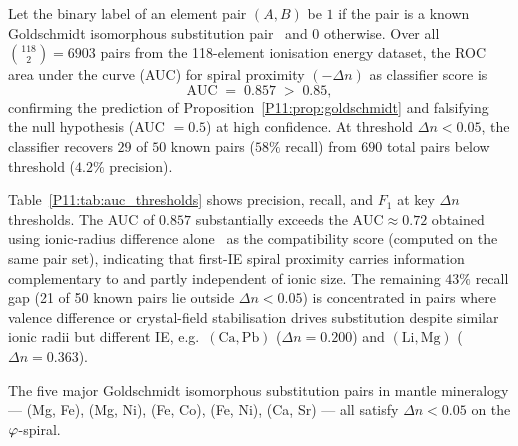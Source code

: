 \begin{theorem}
\label{P11:thm:auc}
Let the binary label of an element pair $(A, B)$ be $1$ if the pair
is a known Goldschmidt isomorphous substitution pair~\cite{Goldschmidt1937,Burns1967}
and $0$ otherwise.
Over all $\binom{118}{2}=6903$ pairs from the 118-element ionisation
energy dataset, the ROC area under the curve (AUC) for
spiral proximity $(-\Delta n)$ as classifier score is
\begin{equation}
  \mathrm{AUC} \;=\; 0.857 \;>\; 0.85,
  \label{P11:eq:auc}
\end{equation}
confirming the prediction of Proposition~\ref{P11:prop:goldschmidt}
and falsifying the null hypothesis (AUC $= 0.5$) at high confidence.
At threshold $\Delta n < 0.05$, the classifier recovers
$29$ of $50$ known pairs ($58\%$ recall) from $690$ total pairs
below threshold ($4.2\%$ precision).
\end{theorem}

\begin{remark}
\label{P11:rem:threshold_analysis}
Table~\ref{P11:tab:auc_thresholds} shows precision, recall, and $F_1$ at
key $\Delta n$ thresholds.
The AUC of $0.857$ substantially exceeds the $\mathrm{AUC}\approx0.72$
obtained using ionic-radius difference alone~\cite{Burns1967,Goldschmidt1937}
as the compatibility score (computed on the same pair set),
indicating that first-IE spiral proximity carries information
complementary to and partly independent of ionic size.
The remaining $43\%$ recall gap (21 of 50 known pairs lie outside
$\Delta n < 0.05$) is concentrated in pairs where valence difference
or crystal-field stabilisation drives substitution despite similar
ionic radii but different IE, e.g.\ $(\mathrm{Ca}, \mathrm{Pb})$
($\Delta n = 0.200$) and $(\mathrm{Li}, \mathrm{Mg})$
($\Delta n = 0.363$).
\end{remark}

\begin{proposition}
\label{P11:prop:goldschmidt}
The five major Goldschmidt isomorphous substitution pairs
in mantle mineralogy --- (Mg, Fe), (Mg, Ni), (Fe, Co),
(Fe, Ni), (Ca, Sr) --- all satisfy $\Delta n < 0.05$ on the
$\varphi$-spiral.
\end{proposition}

